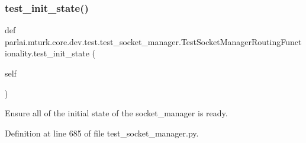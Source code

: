 \subsubsection{\texorpdfstring{test\+\_\+init\+\_\+state()}{test\_init\_state()}}
{\footnotesize\ttfamily def parlai.\+mturk.\+core.\+dev.\+test.\+test\+\_\+socket\+\_\+manager.\+Test\+Socket\+Manager\+Routing\+Functionality.\+test\+\_\+init\+\_\+state (\begin{DoxyParamCaption}\item[{}]{self }\end{DoxyParamCaption})}

\begin{DoxyVerb}Ensure all of the initial state of the socket_manager is ready.
\end{DoxyVerb}
 

Definition at line 685 of file test\+\_\+socket\+\_\+manager.\+py.


